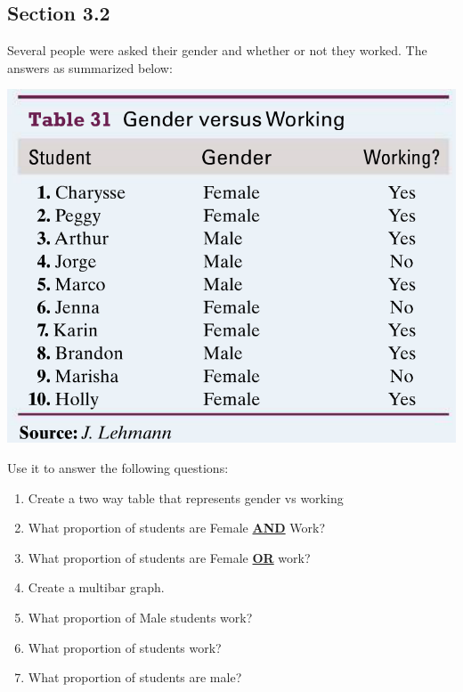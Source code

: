 \documentclass[12pt]{scrartcl}
\theoremstyle{definition}
\begin{document}
\subsection*{Section 3.2}
Several people were asked their gender and whether or not they worked. The answers as summarized below:
\begin{center}
	\includegraphics[scale=0.5]{ReviewSec32}
\end{center}
Use it to answer the following questions:
\begin{enumerate}
	\item Create a two way table that represents gender vs working
	\item What proportion of students are Female \textbf{\underline{AND}} Work?
	\item What proportion of students are Female \textbf{\underline{OR}} work?
	\item Create a multibar graph.
	\item What proportion of Male students work?
	\item What proportion of students work?
	\item What proportion of students are male?
\end{enumerate}
\end{document}
